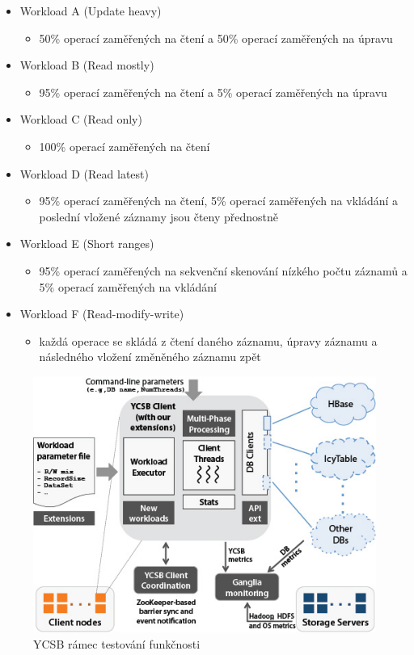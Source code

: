\documentclass[czech,master,dept460,male,csharp,cpdeclaration]{diploma}
\begin{document}
	\begin{itemize} \label{lab-workloads}
		\item Workload A (Update heavy)
		\begin{itemize}
			\item 50\% operací zaměřených na čtení a 50\% operací zaměřených na úpravu
		\end{itemize}
		\item Workload B (Read mostly)
		\begin{itemize}
			\item 95\% operací zaměřených na čtení a 5\% operací zaměřených na úpravu
		\end{itemize}
		\item Workload C (Read only)
		\begin{itemize}
			\item 100\% operací zaměřených na čtení
		\end{itemize}
		\item Workload D (Read latest)
		\begin{itemize}
			\item 95\% operací zaměřených na čtení, 5\% operací zaměřených na vkládání a poslední vložené záznamy jsou čteny přednostně
		\end{itemize}
		\item Workload E (Short ranges)
		\begin{itemize}
			\item 95\% operací zaměřených na sekvenční skenování nízkého počtu záznamů a 5\% operací zaměřených na vkládání
		\end{itemize}
		\item Workload F (Read-modify-write)
		\begin{itemize}
			\item každá operace se skládá z čtení daného záznamu, úpravy záznamu a následného vložení změněného záznamu zpět
		\end{itemize}
	\end{itemize}

	\begin{figure}
		\centering
		\includegraphics[scale=0.85]{Data/ycsb-1.jpg}
		\caption{YCSB rámec testování funkčnosti \cite{ycsb-parallel-data-lab}\label{ycsb-blok-schema}}
	\end{figure}
\end{document}

